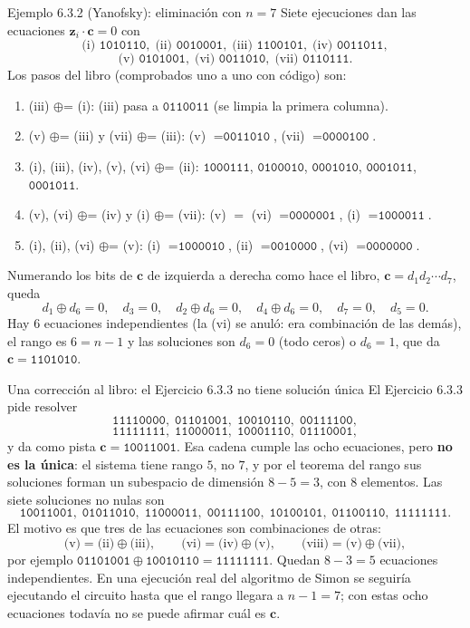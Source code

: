 \documentclass[11pt, a4paper, twoside, openright]{report}
\newcommand{\bz}{\mathbf{z}}
\newcommand{\bc}{\mathbf{c}}
\begin{document}
\begin{ejemplo}{Ejemplo 6.3.2 (Yanofsky): eliminación con $n = 7$}
Siete ejecuciones dan las ecuaciones $\bz_i\cdot\bc = 0$ con
\[ \text{(i) } \texttt{1010110}, \; \text{(ii) } \texttt{0010001}, \; \text{(iii) } \texttt{1100101}, \; \text{(iv) } \texttt{0011011}, \]
\[ \text{(v) } \texttt{0101001}, \; \text{(vi) } \texttt{0011010}, \; \text{(vii) } \texttt{0110111}. \]
Los pasos del libro (comprobados uno a uno con código) son:
\begin{enumerate}
\item (iii) $\oplus$= (i): (iii) pasa a $\texttt{0110011}$ (se limpia la primera columna).
\item (v) $\oplus$= (iii) y (vii) $\oplus$= (iii): (v) $= \texttt{0011010}$, (vii) $= \texttt{0000100}$.
\item (i), (iii), (iv), (v), (vi) $\oplus$= (ii): $\texttt{1000111}$, $\texttt{0100010}$, $\texttt{0001010}$, $\texttt{0001011}$, $\texttt{0001011}$.
\item (v), (vi) $\oplus$= (iv) y (i) $\oplus$= (vii): (v) $=$ (vi) $= \texttt{0000001}$, (i) $= \texttt{1000011}$.
\item (i), (ii), (vi) $\oplus$= (v): (i) $= \texttt{1000010}$, (ii) $= \texttt{0010000}$, (vi) $= \texttt{0000000}$.
\end{enumerate}
Numerando los bits de $\bc$ de izquierda a derecha como hace el libro, $\bc = d_1d_2\cdots d_7$, queda
\[ d_1\oplus d_6 = 0, \quad d_3 = 0, \quad d_2\oplus d_6 = 0, \quad d_4\oplus d_6 = 0, \quad d_7 = 0, \quad d_5 = 0. \]
Hay $6$ ecuaciones independientes (la (vi) se anuló: era combinación de las demás), el rango es $6 = n-1$ y las soluciones son $d_6 = 0$ (todo ceros) o $d_6 = 1$, que da $\bc = \texttt{1101010}$.
\end{ejemplo}

\begin{aclaracion}{Una corrección al libro: el Ejercicio 6.3.3 no tiene solución única}
El Ejercicio 6.3.3 pide resolver
\[ \texttt{11110000},\; \texttt{01101001},\; \texttt{10010110},\; \texttt{00111100}, \]
\[ \texttt{11111111},\; \texttt{11000011},\; \texttt{10001110},\; \texttt{01110001}, \]
y da como pista $\bc = \texttt{10011001}$. Esa cadena cumple las ocho ecuaciones, pero \textbf{no es la única}: el sistema tiene rango $5$, no $7$, y por el teorema del rango sus soluciones forman un subespacio de dimensión $8 - 5 = 3$, con $8$ elementos. Las siete soluciones no nulas son
\[ \texttt{10011001},\; \texttt{01011010},\; \texttt{11000011},\; \texttt{00111100},\; \texttt{10100101},\; \texttt{01100110},\; \texttt{11111111}. \]
El motivo es que tres de las ecuaciones son combinaciones de otras:
\[ \text{(v)} = \text{(ii)}\oplus\text{(iii)}, \qquad \text{(vi)} = \text{(iv)}\oplus\text{(v)}, \qquad \text{(viii)} = \text{(v)}\oplus\text{(vii)}, \]
por ejemplo $\texttt{01101001}\oplus\texttt{10010110} = \texttt{11111111}$. Quedan $8 - 3 = 5$ ecuaciones independientes. En una ejecución real del algoritmo de Simon se seguiría ejecutando el circuito hasta que el rango llegara a $n - 1 = 7$; con estas ocho ecuaciones todavía no se puede afirmar cuál es $\bc$.
\end{aclaracion}
\end{document}
